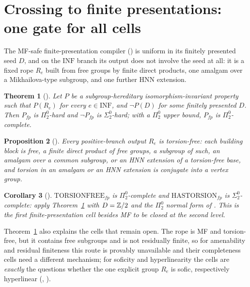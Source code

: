 \documentclass[11pt]{article}
\newtheorem{theorem}{Theorem}[section]
\newtheorem{proposition}[theorem]{Proposition}
\newtheorem{corollary}[theorem]{Corollary}
\theoremstyle{definition}
\newcommand{\Pizt}{\Pi^0_2}\newcommand{\Sizt}{\Sigma^0_2}\newcommand{\Pith}{\Pi^0_3}\newcommand{\Sith}{\Sigma^0_3}
\begin{document}
\section{Crossing to finite presentations: one gate for all cells}
The MF-safe finite-presentation compiler () is uniform in its finitely presented seed $D$, and on the $\mathrm{INF}$ branch its output does not involve the seed at all: it is a fixed rope $R_e$ built from free groups by finite direct products, one amalgam over a Mikhailova-type subgroup, and one further HNN extension.
\begin{theorem}[]\label{thm:fpgate}
Let $P$ be a subgroup-hereditary isomorphism-invariant property such that $P(R_e)$ for every $e\in\mathrm{INF}$, and $\neg P(D)$ for some finitely presented $D$. Then $P_{fp}$ is $\Pizt$-hard and $\neg P_{fp}$ is $\Sizt$-hard; with a $\Pizt$ upper bound, $P_{fp}$ is $\Pizt$-complete.
\end{theorem}
\begin{proposition}[]
Every positive-branch output $R_e$ is torsion-free: each building block is free, a finite direct product of free groups, a subgroup of such, an amalgam over a common subgroup, or an HNN extension of a torsion-free base, and torsion in an amalgam or an HNN extension is conjugate into a vertex group.
\end{proposition}
\begin{corollary}[]
$\mathrm{TORSIONFREE}_{fp}$ is $\Pizt$-complete and $\mathrm{HASTORSION}_{fp}$ is $\Sizt$-complete: apply Theorem~\ref{thm:fpgate} with $D=\mathbb Z/2$ and the $\Pizt$ normal form of . This is the first finite-presentation cell besides MF to be closed at the second level.
\end{corollary}
Theorem~\ref{thm:fpgate} also explains the cells that remain open. The rope is MF and torsion-free, but it contains free subgroups and is not residually finite, so for amenability and residual finiteness this route is provably unavailable and their completeness cells need a different mechanism; for soficity and hyperlinearity the cells are \emph{exactly} the questions whether the one explicit group $R_e$ is sofic, respectively hyperlinear (, ).
\end{document}
